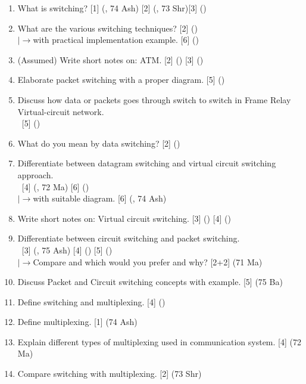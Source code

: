 \documentclass[12pt]{article}
\newcommand{\lb}{\\$\left|\rightarrow\right.$}
\newcommand{\enter}{\\\textcolor{white}{1}}
\begin{document}
		\begin{enumerate}[noitemsep, topsep=0pt]
			\item What is switching? \hfill [1] (, 74 Ash) [2] (, 73 Shr)[3] ()
			
			\item What are the various switching techniques? \hfill [2] ()
			\lb with practical implementation example. \hfill [6] ()

			\item (Assumed) Write short notes on: ATM. \hfill [2] () [3] ()

			\item Elaborate packet switching with a proper diagram. \hfill [5] ()	
			
			\item Discuss how data or packets goes through switch to switch in Frame Relay Virtual-circuit network.
			\enter\hfill [5] ()
			
			\item What do you mean by data switching? \hfill [2] ()
			
			\item Differentiate between datagram switching and virtual circuit switching approach. 
			\enter \hfill [4] (, 72 Ma) [6] ()
			\lb with suitable diagram. \hfill [6] (, 74 Ash)

			\item Write short notes on: Virtual circuit switching. \hfill [3] () [4] ()
			
			\item Differentiate between circuit switching and packet switching. 
			\enter\hfill [3] (, 75 Ash) [4] () [5] ()
			\lb Compare and which would you prefer and why? \hfill [2+2] (71 Ma)
			
			\item Discuss Packet and Circuit switching concepts with example. \hfill [5] (75 Ba)
			
			\item Define switching and multiplexing. \hfill [4] ()			
			
			\item Define multiplexing. \hfill [1] (74 Ash)
			
			\item Explain different types of multiplexing used in communication system. \hfill [4] (72 Ma)
			
			\item Compare switching with multiplexing. \hfill [2] (73 Shr)
		\end{enumerate}
\end{document}
